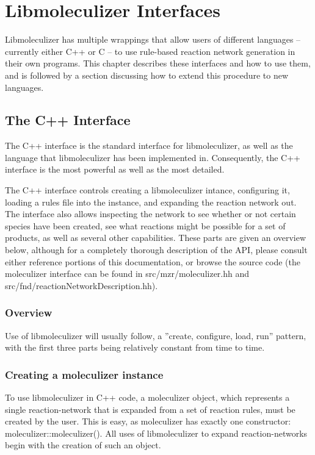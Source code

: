 \chapter{Libmoleculizer Interfaces}
\label{chap:interfacesChapter}

Libmoleculizer has multiple wrappings that allow users of different
languages -- currently either C++ or C -- to use rule-based reaction
network generation in their own programs.  This chapter describes
these interfaces and how to use them, and is followed by a section
discussing how to extend this procedure to new languages.

\section{The C++ Interface}
The C++ interface is the standard interface for libmoleculizer, as
well as the language that libmoleculizer has been implemented in.
Consequently, the C++ interface is the most powerful as well as the
most detailed. 

The C++ interface controls creating a libmoleculizer intance,
configuring it, loading a rules file into the instance, and expanding
the reaction network out.  The interface also allows inspecting the
network to see whether or not certain species have been created, see
what reactions might be possible for a set of products, as well as
several other capabilities.  These parts are given an overview below,
although for a completely thorough description of the API, please
consult either reference portions of this documentation, or browse the
source code (the moleculizer interface can be found in
src/mzr/moleculizer.hh and src/fnd/reactionNetworkDescription.hh).

\subsection{Overview}
Use of libmoleculizer will usually follow, a ''create, configure,
load, run'' pattern, with the first three parts being relatively
constant from time to time.  

\subsection{Creating a moleculizer instance}
To use libmoleculizer in C++ code, a moleculizer object, which
represents a single reaction-network that is expanded from a set of
reaction rules, must be created by the user. This is easy, as
moleculizer has exactly one constructor: moleculizer::moleculizer().
All uses of libmoleculizer to expand reaction-networks begin with the
creation of such an object.

